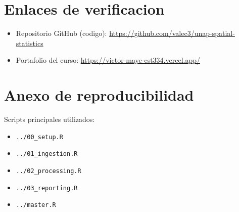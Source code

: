 \documentclass[11pt,a4paper]{article}
\begin{document}
\section{Enlaces de verificacion}
\begin{itemize}
    \item Repositorio GitHub (codigo): \href{https://github.com/valec3/unap-spatial-statistics}{https://github.com/valec3/unap-spatial-statistics}
    \item Portafolio del curso: \href{https://victor-maye-est334.vercel.app/}{https://victor-maye-est334.vercel.app/}
\end{itemize}

\section{Anexo de reproducibilidad}
Scripts principales utilizados:
\begin{itemize}
    \item \texttt{../00\_setup.R}
    \item \texttt{../01\_ingestion.R}
    \item \texttt{../02\_processing.R}
    \item \texttt{../03\_reporting.R}
    \item \texttt{../master.R}
\end{itemize}
\end{document}
